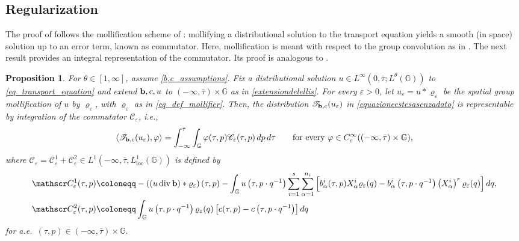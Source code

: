 \documentclass[11pt]{amsart}
\newcommand{\bb}{{\bf {b}}} %
\renewcommand{\rho}{\varrho} %
\newcommand{\eps}{\varepsilon}
\DeclareMathOperator{\divv}{div}
\theoremstyle{plain}
\newtheorem{proposition}[theorem]{Proposition}
\theoremstyle{definition}
\theoremstyle{remark}
\numberwithin{equation}{section}
\begin{document}
\subsection{Regularization}\label{sec_refgogogog}
The proof of  follows the mollification  scheme of \cite{MR1022305}: mollifying a distributional solution to the transport equation yields a smooth (in space) solution up to an error term, known as commutator. Here, mollification is meant with respect to the group convolution as in . %
The next result provides an integral representation of the commutator. Its proof is analogous to \cite[Proposition 4.9]{dpl1}.
\begin{proposition}\label{prop_formadelresto}
 For $\theta \in [1,\infty]$, assume \eqref{b,c_assumptions}. Fix a distributional solution $u \in L^\infty\left(0,\bar{\tau}; L^\theta(\mathbb{G})\right)$ to \eqref{eq_transport_equation} and extend $\bb,c,u$ to $(-\infty,\bar\tau) \times \mathbb{G}$ as in \eqref{extensiondelellis}. For every $\varepsilon>0$, let $u_\varepsilon = u*\rho_\varepsilon$ be the spatial group mollification of $u$ by $\rho_\varepsilon$, with $\rho_\varepsilon$ as in \eqref{eq_def_mollifier}. Then, the distribution $\mathscr T_{\bb,c}(u_\varepsilon)$ in \eqref{equazioneestesasenzadato} is representable by integration of the \emph{commutator} $\mathscr C_\varepsilon$, i.e.,
  \begin{equation*}
        \left\langle \mathscr T_{\bb,c}(u_\varepsilon),\varphi\right\rangle=\int_{-\infty}^{\bar\tau}\int_{\mathbb{G}}\varphi(\tau,p)\mathscr C_\varepsilon(\tau,p)\,dp\,d\tau\qquad\text{for every $\varphi\in C^\infty_c((-\infty,\bar\tau)\times\mathbb{G})$,}
  \end{equation*}
where
$\mathscr C_\varepsilon=\mathscr C_\varepsilon^1+\mathscr C_\varepsilon^2\in L^1\left(-\infty,\bar\tau,L_{\mathrm{loc}}^1(\mathbb{G})\right)$ is defined by 
\begin{align*}
    \mathscr C_\eps^1(\tau,p)&\coloneqq -\left((u\divv \bb)*\rho_\varepsilon\right)(\tau, p)-\int_{\mathbb{G}}u\left(\tau, p\cdot q^{-1} \right)\sum_{i=1}^s \sum_{\alpha=1}^{n_i} \left[b^i_\alpha(\tau, p) X^i_\alpha \rho_\varepsilon(q)-b^i_\alpha \left(\tau, p\cdot q^{-1} \right) \left(X^i_\alpha\right)^r \rho_\varepsilon(q)\right] dq,\\
     \mathscr C_\eps^2(\tau,p)&\coloneqq \int_{\mathbb{G}}u\left(\tau, p\cdot q^{-1}\right )\rho_\varepsilon(q)\left[c(\tau, p )-c\left(\tau, p\cdot q^{-1}\right)\right] dq
\end{align*}
for a.e.~$(\tau,p)\in(-\infty,\bar\tau)\times\mathbb{G}$.
\end{proposition}
\end{document}
